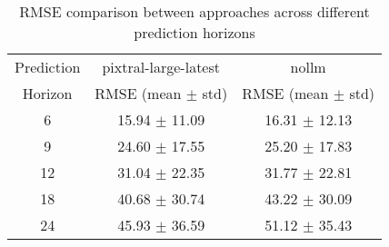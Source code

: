 \begin{table}[h]
\centering
\begin{tabular}{c|c|c}
\hline
Prediction & pixtral-large-latest & nollm \\
Horizon & RMSE (mean $\pm$ std) & RMSE (mean $\pm$ std) \\
\hline
6 & 15.94 $\pm$ 11.09 & 16.31 $\pm$ 12.13 \\
9 & 24.60 $\pm$ 17.55 & 25.20 $\pm$ 17.83 \\
12 & 31.04 $\pm$ 22.35 & 31.77 $\pm$ 22.81 \\
18 & 40.68 $\pm$ 30.74 & 43.22 $\pm$ 30.09 \\
24 & 45.93 $\pm$ 36.59 & 51.12 $\pm$ 35.43 \\
\hline
\end{tabular}
\caption{RMSE comparison between approaches across different prediction horizons}
\label{tab:rmse_comparison}
\end{table}
